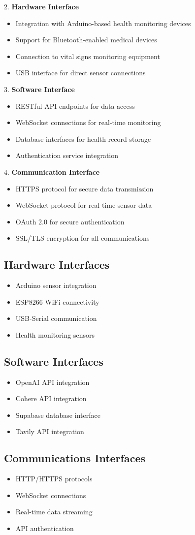2. \textbf{Hardware Interface}
\begin{itemize}
    \item Integration with Arduino-based health monitoring devices
    \item Support for Bluetooth-enabled medical devices
    \item Connection to vital signs monitoring equipment
    \item USB interface for direct sensor connections
\end{itemize}

3. \textbf{Software Interface}
\begin{itemize}
    \item RESTful API endpoints for data access
    \item WebSocket connections for real-time monitoring
    \item Database interfaces for health record storage
    \item Authentication service integration
\end{itemize}

4. \textbf{Communication Interface}
\begin{itemize}
    \item HTTPS protocol for secure data transmission
    \item WebSocket protocol for real-time sensor data
    \item OAuth 2.0 for secure authentication
    \item SSL/TLS encryption for all communications
\end{itemize}

\subsection{Hardware Interfaces}
\begin{itemize}
    \item Arduino sensor integration
    \item ESP8266 WiFi connectivity
    \item USB-Serial communication
    \item Health monitoring sensors
\end{itemize}

\subsection{Software Interfaces}
\begin{itemize}
    \item OpenAI API integration
    \item Cohere API integration
    \item Supabase database interface
    \item Tavily API integration
\end{itemize}

\subsection{Communications Interfaces}
\begin{itemize}
    \item HTTP/HTTPS protocols
    \item WebSocket connections
    \item Real-time data streaming
    \item API authentication
\end{itemize} 